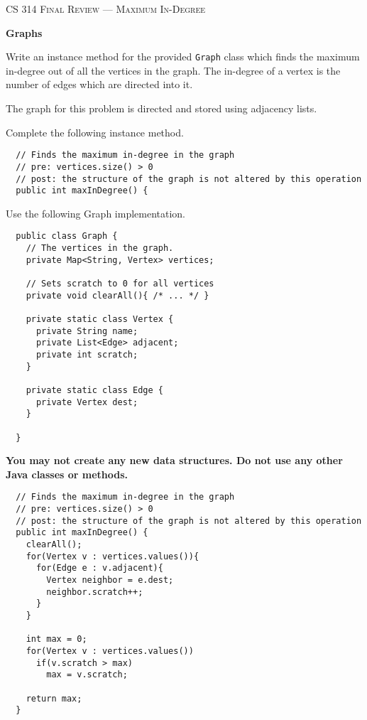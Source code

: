 \documentclass[12pt,letter]{article}
\begin{document}
\noindent\textsc{\large CS 314 Final Review --- Maximum In-Degree}

\vspace{6pt}
\noindent\textbf{Graphs}

\vspace{2pt}
\noindent Write an instance method for the provided \texttt{Graph} class which finds the
maximum in-degree out of all the vertices in the graph. The in-degree of a vertex
is the number of edges which are directed into it.

\vspace{4pt} 
\noindent The graph for this problem is directed and stored using adjacency lists.

\vspace{6pt}
\noindent Complete the following instance method.
\begin{verbatim}
  // Finds the maximum in-degree in the graph
  // pre: vertices.size() > 0
  // post: the structure of the graph is not altered by this operation
  public int maxInDegree() {
\end{verbatim}

\vspace{4pt}
\noindent Use the following Graph implementation.

\begin{verbatim}
  public class Graph {
    // The vertices in the graph.
    private Map<String, Vertex> vertices;

    // Sets scratch to 0 for all vertices
    private void clearAll(){ /* ... */ }

    private static class Vertex {
      private String name;
      private List<Edge> adjacent;
      private int scratch;
    }

    private static class Edge {
      private Vertex dest;
    }    

  }
\end{verbatim}

\noindent \textbf{You may not create any new data structures. \newline Do not use any other Java classes or methods.}

\clearpage
\begin{verbatim}
  // Finds the maximum in-degree in the graph
  // pre: vertices.size() > 0
  // post: the structure of the graph is not altered by this operation
  public int maxInDegree() {
    clearAll();
    for(Vertex v : vertices.values()){
      for(Edge e : v.adjacent){
        Vertex neighbor = e.dest;
        neighbor.scratch++;
      }
    }

    int max = 0;
    for(Vertex v : vertices.values())
      if(v.scratch > max)
        max = v.scratch;
  
    return max;
  }
\end{verbatim}
\end{document}
